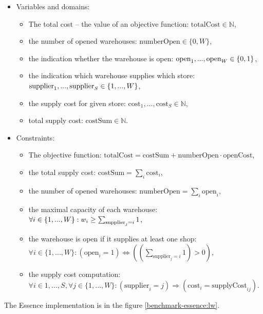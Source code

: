\pagebreak[4]
	\begin{itemize}
  \item Variables and domains:
    \begin{itemize}
      \item The total cost -- the value of an objective function: $\mathrm{totalCost} \in \mathbb{N} $,
      \item the number of opened warehouses: $\mathrm{numberOpen} \in \{0, W\}$,
      \item the indication whether the warehouse is open: $\mathrm{open}_1, ...,\\ \mathrm{open}_{W} \in \{0, 1\}$,
      \item the indication which warehouse supplies which store: $\mathrm{supplier}_1, ...,\\ \mathrm{supplier}_{S} \in \{1, ..., W\}$,
      \item the supply cost for given store: $\mathrm{cost}_1, ..., \mathrm{cost}_{S} \in \mathbb{N}$,
      \item total supply cost: $\mathrm{costSum} \in \mathbb{N}$.
    \end{itemize} 
	\item Constraints:
  	\begin{itemize}
  	 \item The objective function: $\mathrm{totalCost} = \mathrm{costSum} + \mathrm{numberOpen} \cdot \mathrm{openCost}$,
  	 \item the total supply cost: $\mathrm{costSum} = \sum_i{\mathrm{cost}_i}$,
  	 \item the number of opened warehouses: $\mathrm{numberOpen} = \sum_i{\mathrm{open}_i}$,
  	 \item the maximal capacity of each warehouse: $\forall i \in \{1,...,W\}:\\ w_i \geq \sum_{\mathrm{supplier}_j = i}{1}$,
  	 \item the warehouse is open if it supplies at least one shop:\\ $\forall i \in \{1,...,W\}: \left(\mathrm{open}_i = 1\right) \Leftrightarrow \left(\left(\sum_{\mathrm{supplier}_j = i}{1}\right) > 0\right)$,
  	 \item the supply cost computation: $\forall i \in {1,...,S}, \forall j \in \{1,...,W\}: \left(\mathrm{supplier}_i = j\right) \Rightarrow \left(\mathrm{cost}_i = \mathrm{supplyCost}_{ij} \right)$.
     
    \end{itemize}
  \end{itemize} 
The Essence implementation is in the figure \ref{benchmark-essence:lw}.

